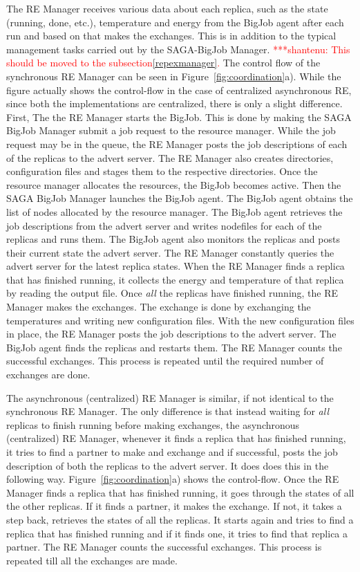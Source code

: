 \documentclass{rspublic}
\newcommand{\jhanote}[1]{ {\textcolor{red} { ***shantenu: #1 }}}
\newcommand{\jhanote}[1]{}
\begin{document}
The RE Manager receives various data about each
replica, such as the state (running, done, etc.), temperature and
energy from the BigJob agent after each run and based on that makes
the exchanges. This is in addition to the typical management tasks
carried out by the SAGA-BigJob Manager.  \jhanote{This should be 
moved to the subsection\ref{repexmanager}.}
The control flow of the synchronous RE Manager can be seen in Figure~\ref{fig:coordination}a). While the figure actually shows the control-flow in the case of centralized asynchronous RE, since both the implementations are centralized, there is only a slight difference. First, The the RE Manager starts the BigJob. This is done by making the SAGA BigJob Manager submit a job request to the resource manager. While the job request may be in the queue, the RE Manager posts the job descriptions of each of the replicas to the advert server. The RE Manager also creates directories, configuration files and stages them to the respective directories. Once the resource manager allocates the resources, the BigJob becomes active. Then the SAGA BigJob Manager launches the BigJob agent. The BigJob agent obtains the list of nodes allocated by the resource manager. The BigJob agent retrieves the job descriptions from the advert server and writes nodefiles for each of the replicas and runs them. The BigJob agent also monitors the replicas and posts their current state the advert server. The RE Manager constantly queries the advert server for the latest replica states. When the RE Manager finds a replica that has finished running, it collects the energy and temperature of that replica by reading the output file. Once \emph{all} the replicas have finished running, the RE Manager makes the exchanges. The exchange is done by exchanging the temperatures and writing new configuration files. With the new configuration files in place, the RE Manager posts the job descriptions to the advert server. The BigJob agent finds the replicas and restarts them. The RE Manager counts the successful exchanges. This process is repeated until the required number of exchanges are done. 

The asynchronous (centralized) RE Manager is similar, if not identical to the synchronous RE Manager. The only difference is that instead waiting for \emph{all} replicas to finish running before making exchanges, the asynchronous (centralized) RE Manager, whenever it finds a replica that has finished running, it tries to find a partner to make and exchange and if successful, posts the job description of both the replicas to the advert server. It does does this in the following way. Figure~\ref{fig:coordination}a) shows the control-flow. Once the RE Manager finds a replica that has finished running, it goes through the states of all the other replicas. If it finds a partner, it makes the exchange. If not, it takes a step back, retrieves the states of all the replicas. It starts again and tries to find a replica that has finished running and if it finds one, it tries to find that replica a partner. The RE Manager counts the successful exchanges. This process is repeated till all the exchanges are made. 
\end{document}
